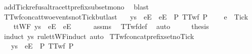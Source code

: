 \begin{isabellebody}
\ add{\isacharunderscore}Tick{\isacharunderscore}refusal{\isacharunderscore}trace{\isacharunderscore}tt{\isacharunderscore}prefix{\isacharunderscore}subset{\isacharunderscore}mono\ \isamarkupfalse%
\ blast%
\endisatagproof
{\isafoldproof}%
%
\isadelimproof
\isanewline
%
\endisadelimproof
\isanewline
{}\isamarkupfalse%
\ TTwf{\isacharunderscore}concat{\isacharunderscore}two{\isacharunderscore}events{\isacharunderscore}not{\isacharunderscore}Tick{\isacharunderscore}butlast{\isacharcolon}\isanewline
\ \ \ {\isachardoublequoteopen}ys\ {\isacharat}\ {\isacharbrackleft}{\isacharbrackleft}e{}{\isacharbrackright}\isactrlsub E{\isacharbrackright}\ {\isacharat}\ {\isacharbrackleft}{\isacharbrackleft}e{}{\isacharbrackright}\isactrlsub E{\isacharbrackright}\ {\isasymin}\ P{\isachardoublequoteclose}\ {\isachardoublequoteopen}TTwf\ P{\isachardoublequoteclose}\ \isanewline
\ \ \ {\isachardoublequoteopen}e{}\ {\isasymnoteq}\ Tick{\isachardoublequoteclose}\isanewline
%
\isadelimproof
%
\endisadelimproof
%
\isatagproof
{}\isamarkupfalse%
\ {\isacharminus}\isanewline
\ \ \isamarkupfalse%
\ {\isachardoublequoteopen}ttWF\ {\isacharparenleft}ys\ {\isacharat}\ {\isacharbrackleft}{\isacharbrackleft}e{}{\isacharbrackright}\isactrlsub E{\isacharbrackright}\ {\isacharat}\ {\isacharbrackleft}{\isacharbrackleft}e{}{\isacharbrackright}\isactrlsub E{\isacharbrackright}{\isacharparenright}{\isachardoublequoteclose}\isanewline
\ \ \ \ \isamarkupfalse%
\ assms\ \isamarkupfalse%
\ TTwf{\isacharunderscore}def\ \isamarkupfalse%
\ auto\isanewline
\ \ \isamarkupfalse%
\ \isamarkupfalse%
\ {\isacharquery}thesis\isanewline
\ \ \ \ \isamarkupfalse%
\ {\isacharparenleft}induct\ ys\ rule{\isacharcolon}ttWF{\isachardot}induct{\isacharcomma}\ auto{\isacharparenright}\isanewline
{}\isamarkupfalse%
%
\endisatagproof
{\isafoldproof}%
%
\isadelimproof
\isanewline
%
\endisadelimproof
\isanewline
{}\isamarkupfalse%
\ TTwf{\isacharunderscore}concat{\isacharunderscore}prefix{\isacharunderscore}set{\isacharunderscore}no{\isacharunderscore}Tick{\isacharcolon}\isanewline
\ \ \ {\isachardoublequoteopen}ys\ {\isacharat}\ {\isacharbrackleft}{\isacharbrackleft}e{}{\isacharbrackright}\isactrlsub E{\isacharbrackright}\ {\isasymin}\ P{\isachardoublequoteclose}\ {\isachardoublequoteopen}TTwf\ P{\isachardoublequoteclose}\ \isanewline

\end{isabellebody}
